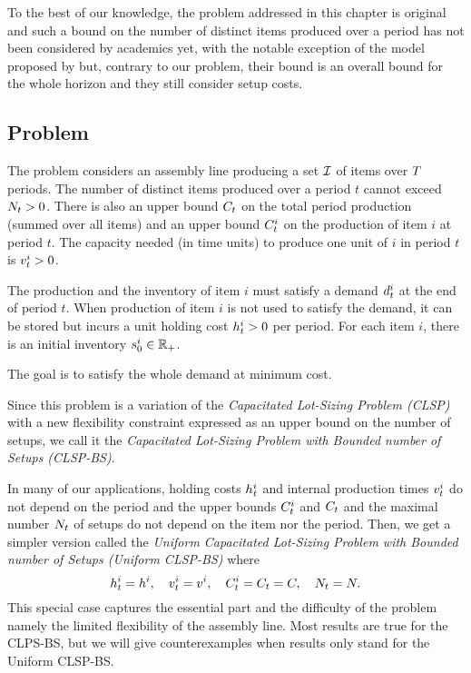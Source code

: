 To the best of our knowledge, the problem addressed in this chapter is original and such a bound on the number of distinct items produced over a period has not been considered by academics yet, with the notable exception of the model proposed by \citet{Rubaszewski2011} but, contrary to our problem, their bound is an overall bound for the whole horizon and they still consider setup costs.



\subsection{Problem}
\label{sec:PDP:deterministic:introduction:problem}

The problem considers an assembly line producing a set $\mathcal{I}$ of items over $T$ periods.
The number of distinct items produced over a period $t$ cannot exceed $N_t>0$.
There is also an upper bound $C_t$ on the total period production (summed over all items) and an upper bound $C_t^i$ on the production of item $i$ at period $t$.
The capacity needed (in time units) to produce one unit of $i$ in period $t$ is $v_t^i>0$.

The production and the inventory of item $i$ must satisfy a demand $d_t^i$ at the end of period $t$.
When production of item $i$ is not used to satisfy the demand, it can be stored but incurs a unit holding cost $h_t^i>0$ per period.
For each item $i$, there is an initial inventory $s_0^i\in\mathbb{R}_+$.

The goal is to satisfy the whole demand at minimum cost.

Since this problem is a variation of the \emph{Capacitated Lot-Sizing Problem (CLSP)} with a new flexibility constraint expressed as an upper bound on the number of setups, we call it the \emph{Capacitated Lot-Sizing Problem with Bounded number of Setups (CLSP-BS)}.

In many of our applications, holding costs $h_t^i$ and internal production times $v_t^i$ do not depend on the period and the upper bounds $C_t^i$ and $C_t$ and the maximal number $N_t$ of setups do not depend on the item nor the period.
Then, we get a simpler version called the \emph{Uniform Capacitated Lot-Sizing Problem with Bounded number of Setups (Uniform CLSP-BS)} where
\begin{equation}
  h_t^i=h^i,\quad
  v_t^i=v^i,\quad
  C_t^i=C_t=C,\quad
  N_t=N.
\end{equation}
This special case captures the essential part and the difficulty of the problem namely the limited flexibility of the assembly line.
Most results are true for the CLPS-BS, but we will give counterexamples when results only stand for the Uniform CLSP-BS.


